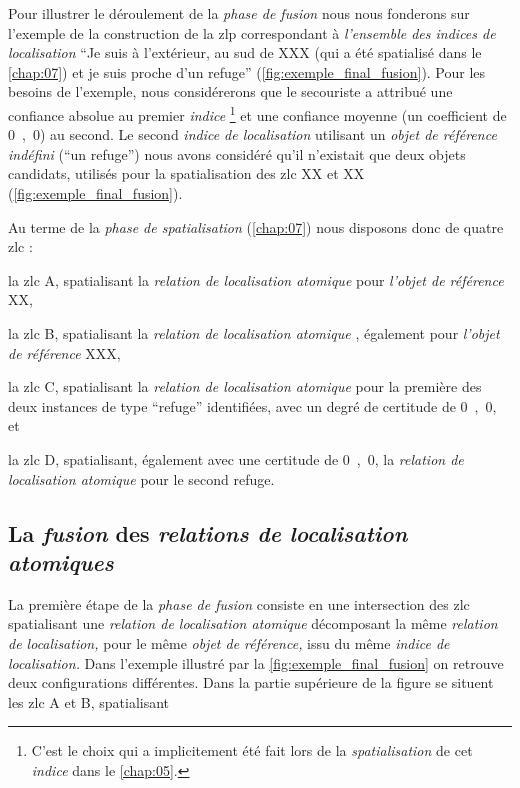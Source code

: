 Pour illustrer le déroulement de la \emph{phase de fusion} nous nous
fonderons sur l'exemple de la construction de la \ac{zlp}
correspondant à \emph{l'ensemble des indices de localisation}
\enquote{Je suis à l'extérieur, au sud de XXX (qui a été spatialisé
  dans le \autoref{chap:07}) et je suis proche d'un refuge}
(\autoref{fig:exemple_final_fusion}). Pour les besoins de l'exemple,
nous considérerons que le secouriste a attribué une confiance absolue
au premier \emph{indice} \footnote{C'est le choix qui a implicitement
  été fait lors de la \emph{spatialisation} de cet \emph{indice} dans
  le \autoref{chap:05}.} et une confiance moyenne (\ie un coefficient
de \si{0,0}) au second. Le second \emph{indice de localisation}
utilisant un \emph{objet de référence indéfini} (\eg \enquote{un
  refuge}) nous avons considéré qu'il n'existait que deux objets
candidats, utilisés pour la spatialisation des \ac{zlc} XX et XX
(\autoref{fig:exemple_final_fusion}).

Au terme de la \emph{phase de spatialisation} (\autoref{chap:07}) nous
disposons donc de quatre \ac{zlc} :
% 
\begin{enumerate*}[label=(\arabic*)]
\item la \ac{zlc} \textcolor{RdBu-9-1}{\textsf{A}}, spatialisant la \emph{relation de localisation
    atomique}  pour \emph{l'objet de référence}
  XX,
\item la \ac{zlc} \textcolor{RdBu-9-3}{\textsf{B}}, spatialisant la \emph{relation de localisation
    atomique} , également pour \emph{l'objet de
    référence} XXX,
\item la \ac{zlc} \textcolor{RdBu-9-7}{\textsf{C}}, spatialisant la \emph{relation de localisation
    atomique}  pour la première des deux instances de
  type \enquote{refuge} identifiées, avec un degré de certitude de \si{0,0}, et
\item la \ac{zlc} \textcolor{RdBu-9-9}{\textsf{D}}, spatialisant,
  également avec une certitude de \si{0,0}, la \emph{relation de
    localisation atomique}  pour le second refuge.
\end{enumerate*}
% 

\subsection{La \emph{fusion} des \emph{relations de localisation
    atomiques}}

La première étape de la \emph{phase de fusion} consiste en une
intersection des \ac{zlc} spatialisant une \emph{relation de
  localisation atomique} décomposant la même \emph{relation de
  localisation,} pour le même \emph{objet de référence,} issu du même
\emph{indice de localisation.} Dans l'exemple illustré par la
\autoref{fig:exemple_final_fusion} on retrouve deux configurations
différentes. Dans la partie supérieure de la figure se situent les
\ac{zlc} \textcolor{RdBu-9-1}{\textsf{A}} et
\textcolor{RdBu-9-3}{\textsf{B}}, spatialisant

